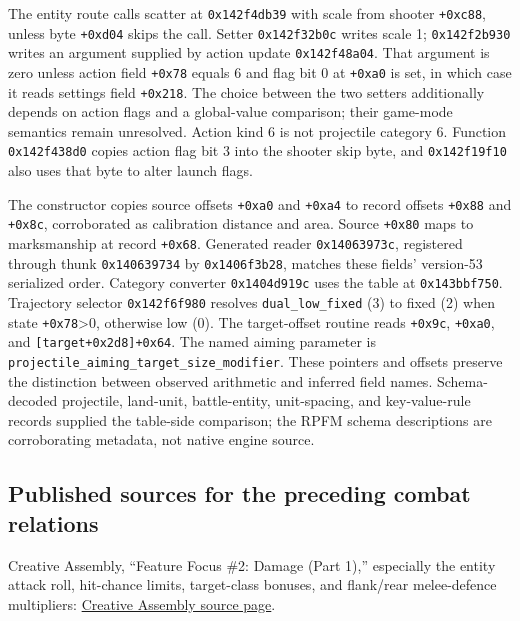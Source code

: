 \documentclass[11pt]{article}
\begin{document}
The entity route calls scatter at \texttt{0x142f4db39} with scale from
shooter \texttt{+0xc88}, unless byte \texttt{+0xd04} skips the call.
Setter \texttt{0x142f32b0c} writes scale 1; \texttt{0x142f2b930} writes an
argument supplied by action update \texttt{0x142f48a04}.  That argument is
zero unless action field \texttt{+0x78} equals 6 and flag bit 0 at
\texttt{+0xa0} is set, in which case it reads settings field \texttt{+0x218}.
The choice between the two setters additionally depends on action flags and
a global-value comparison; their game-mode semantics remain unresolved.
Action kind 6 is not projectile category 6.
Function \texttt{0x142f438d0} copies action flag bit 3 into the shooter skip
byte, and \texttt{0x142f19f10} also uses that byte to alter launch flags.

The constructor copies source offsets \texttt{+0xa0} and \texttt{+0xa4} to
record offsets \texttt{+0x88} and \texttt{+0x8c}, corroborated as calibration
distance and area.  Source \texttt{+0x80} maps to marksmanship at record
\texttt{+0x68}.  Generated reader \texttt{0x14063973c}, registered through
thunk \texttt{0x140639734} by \texttt{0x1406f3b28}, matches these fields'
version-53 serialized order.  Category converter \texttt{0x1404d919c} uses
the table at \texttt{0x143bbf750}.  Trajectory selector
\texttt{0x142f6f980} resolves \texttt{dual\_low\_fixed} (3) to fixed (2)
when state \texttt{+0x78}>0, otherwise low (0).
The target-offset routine reads \texttt{+0x9c}, \texttt{+0xa0}, and
\texttt{[target+0x2d8]+0x64}.  The named aiming parameter is
\texttt{projectile\_aiming\_target\_size\_modifier}.
These pointers and offsets preserve the distinction between observed
arithmetic and inferred field names.  Schema-decoded projectile, land-unit,
battle-entity, unit-spacing, and key-value-rule records supplied the
table-side comparison; the RPFM schema descriptions are corroborating
metadata, not native engine source.

\subsection{Published sources for the preceding combat relations}

Creative Assembly, ``Feature Focus \#2: Damage (Part 1),'' especially the
entity attack roll, hit-chance limits, target-class bonuses, and flank/rear
melee-defence multipliers:
\href{https://community.creative-assembly.com/total-war/total-war-warhammer/blogs/6-feature-focus-2-damage-part-1}{Creative Assembly source page}.
\end{document}
